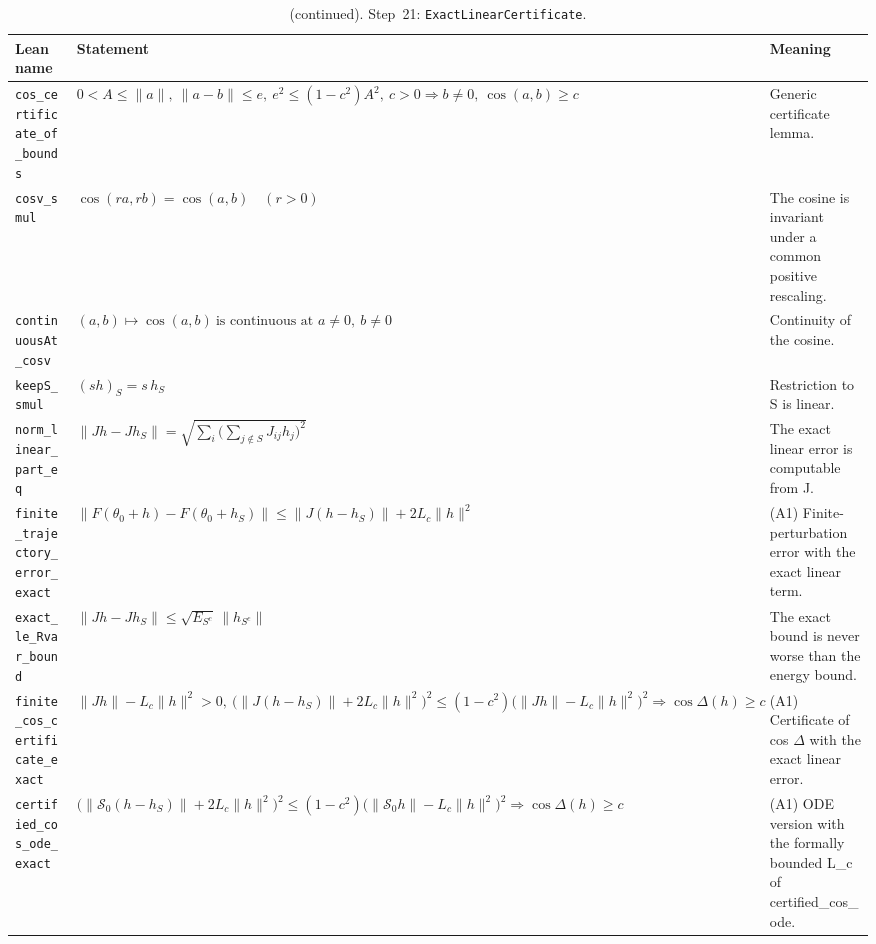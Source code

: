 \addtocounter{table}{-1}
{\small
\begin{longtable}{@{}>{\raggedright\arraybackslash}p{3.6cm}>{\raggedright\arraybackslash}p{6.6cm}>{\raggedright\arraybackslash}p{5.6cm}@{}}
\caption[]{(continued). Step~21: \texttt{ExactLinearCertificate}.}\\
\toprule
Lean name & Statement & Meaning \\
\midrule
\endhead
\texttt{cos\_\allowbreak{}certificate\_\allowbreak{}of\_\allowbreak{}bounds} & $\displaystyle 0<A\le\|a\|,\ \|a-b\|\le e,\ e^2\le(1-c^2)A^2,\ c>0\Rightarrow b\ne0,\ \cos(a,b)\ge c$ & Generic certificate lemma. \\[3pt]
\texttt{cosv\_\allowbreak{}smul} & $\displaystyle \cos(ra,rb)=\cos(a,b)\quad(r>0)$ & The cosine is invariant under a common positive rescaling. \\[3pt]
\texttt{continuousAt\_\allowbreak{}cosv} & $\displaystyle (a,b)\mapsto\cos(a,b)\ \text{is continuous at } a\ne0,\ b\ne0$ & Continuity of the cosine. \\[3pt]
\texttt{keepS\_\allowbreak{}smul} & $\displaystyle (sh)_S=s\,h_S$ & Restriction to S is linear. \\[3pt]
\texttt{norm\_\allowbreak{}linear\_\allowbreak{}part\_\allowbreak{}eq} & $\displaystyle \|Jh-Jh_S\|=\sqrt{\textstyle\sum_i\bigl(\sum_{j\notin S}J_{ij}h_j\bigr)^2}$ & The exact linear error is computable from J. \\[3pt]
\texttt{finite\_\allowbreak{}trajectory\_\allowbreak{}error\_\allowbreak{}exact} & $\displaystyle \|F(\theta_0+h)-F(\theta_0+h_S)\|\le\|J(h-h_S)\|+2L_c\|h\|^2$ & (A1) Finite-perturbation error with the exact linear term. \\[3pt]
\texttt{exact\_\allowbreak{}le\_\allowbreak{}Rvar\_\allowbreak{}bound} & $\displaystyle \|Jh-Jh_S\|\le\sqrt{E_{S^c}}\,\|h_{S^c}\|$ & The exact bound is never worse than the energy bound. \\[3pt]
\texttt{finite\_\allowbreak{}cos\_\allowbreak{}certificate\_\allowbreak{}exact} & $\displaystyle \|Jh\|-L_c\|h\|^2>0,\ \bigl(\|J(h-h_S)\|+2L_c\|h\|^2\bigr)^2\le(1-c^2)\bigl(\|Jh\|-L_c\|h\|^2\bigr)^2\Rightarrow\cos\Delta(h)\ge c$ & (A1) Certificate of cos $\Delta$ with the exact linear error. \\[3pt]
\texttt{certified\_\allowbreak{}cos\_\allowbreak{}ode\_\allowbreak{}exact} & $\displaystyle \bigl(\|\mathcal S_0(h-h_S)\|+2L_c\|h\|^2\bigr)^2\le(1-c^2)\bigl(\|\mathcal S_0h\|-L_c\|h\|^2\bigr)^2\Rightarrow\cos\Delta(h)\ge c$ & (A1) ODE version with the formally bounded L\_c of certified\_cos\_ode. \\[3pt]

\end{longtable}}
